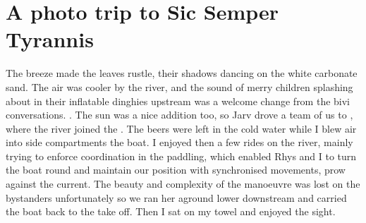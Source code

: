 \section{A photo trip to Sic Semper Tyrannis}
    \begin{marginfigure}
    \end{marginfigure}

    The breeze made the leaves rustle, their shadows dancing on the white carbonate sand. The air was cooler by the  river, and the sound of merry children splashing about in their inflatable dinghies upstream was a welcome change from the bivi conversations. 
    . The sun was a nice addition too, so Jarv drove a team of us to , where the  river joined the . The beers were left in the cold water while I blew air into side compartments the boat. 
    I enjoyed then a few rides on the river, mainly trying to enforce coordination in the paddling, which enabled Rhys and I to turn the boat round and maintain our position with synchronised movements, prow against the current. The beauty and complexity of the manoeuvre was lost on the bystanders unfortunately so we ran her aground lower downstream and carried the boat back to the take off. Then I sat on my towel and enjoyed the sight.


